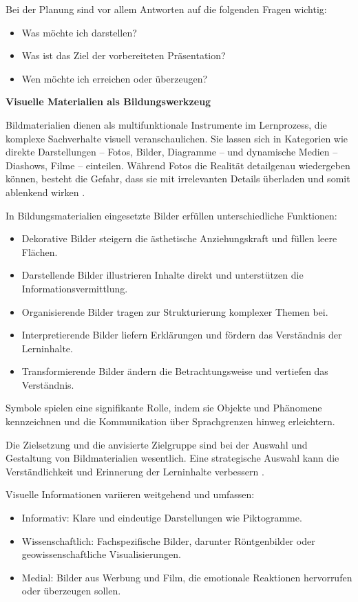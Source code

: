 Bei der Planung sind vor allem Antworten auf die folgenden Fragen wichtig:
\begin{itemize}
	\item Was möchte ich darstellen?
	\item Was ist das Ziel der vorbereiteten Präsentation?
	\item Wen möchte ich erreichen oder überzeugen?
\end{itemize}

\textbf{Visuelle Materialien als Bildungswerkzeug}

Bildmaterialien dienen als multifunktionale Instrumente im Lernprozess, die komplexe Sachverhalte visuell veranschaulichen. Sie lassen sich in Kategorien wie direkte Darstellungen – Fotos, Bilder, Diagramme – und dynamische Medien – Diashows, Filme – einteilen. Während Fotos die Realität detailgenau wiedergeben können, besteht die Gefahr, dass sie mit irrelevanten Details überladen und somit ablenkend wirken \cite{Vermirovsky2010ImportanceVisualisation}. 

In Bildungsmaterialien eingesetzte Bilder erfüllen unterschiedliche Funktionen:

\begin{itemize}
	\item Dekorative Bilder steigern die ästhetische Anziehungskraft und füllen leere Flächen.
	\item Darstellende Bilder illustrieren Inhalte direkt und unterstützen die Informationsvermittlung.
	\item Organisierende Bilder tragen zur Strukturierung komplexer Themen bei.
	\item Interpretierende Bilder liefern Erklärungen und fördern das Verständnis der Lerninhalte.
	\item Transformierende Bilder ändern die Betrachtungsweise und vertiefen das Verständnis.
\end{itemize}

Symbole spielen eine signifikante Rolle, indem sie Objekte und Phänomene kennzeichnen und die Kommunikation über Sprachgrenzen hinweg erleichtern.

Die Zielsetzung und die anvisierte Zielgruppe sind bei der Auswahl und Gestaltung von Bildmaterialien wesentlich. Eine strategische Auswahl kann die Verständlichkeit und Erinnerung der Lerninhalte verbessern \cite{Bilek2007}.

Visuelle Informationen variieren weitgehend und umfassen:

\begin{itemize}
	\item Informativ: Klare und eindeutige Darstellungen wie Piktogramme.
	\item Wissenschaftlich: Fachspezifische Bilder, darunter Röntgenbilder oder geowissenschaftliche Visualisierungen.
	\item Medial: Bilder aus Werbung und Film, die emotionale Reaktionen hervorrufen oder überzeugen sollen.
\end{itemize}

